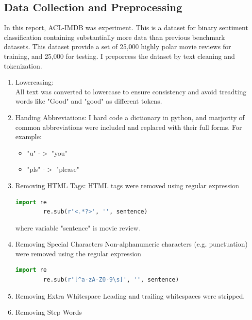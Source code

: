 \documentclass[12pt,a4paper]{article}
\begin{document}
\subsection{Data Collection and Preprocessing}
In this report, ACL-IMDB \parencite{maas-EtAl:2011:ACL-HLT2011} was experiment. This is a dataset for binary sentiment classification containing substantially more data than previous benchmark datasets. This dataset provide a set of 25,000 highly polar movie reviews for training, and 25,000 for testing. I preporcess the dataset by text cleaning and tokenization.
\begin{enumerate}
    \item Lowercasing:\\
    All text was converted to lowercase to ensure consistency and avoid treadting words like "Good" and "good" as different tokens.
    \item Handing Abbreviations:
    I hard code a dictionary in python, and marjority of common abbreviations were included and replaced with their full forms. For example:
    \begin{itemize}
        \item "u" -$>$ "you"
        \item "pls" -$>$ "please"
    \end{itemize}
    \item Removing HTML Tags:
    HTML tags were removed using regular expression 
    \begin{lstlisting}[language=Python] 
        import re
        re.sub(r'<.*?>', '', sentence) 
    \end{lstlisting}
    where variable "sentence" is movie review. 
    \item Removing Special Characters
    Non-alphanumeric characters (e.g. punctuation) were removed using the regular expression
    \begin{lstlisting}[language=Python]
        import re
        re.sub(r'[^a-zA-Z0-9\s]', '', sentence)
    \end{lstlisting}
    \item Removing Extra Whitespace
    Leading and trailing whitespaces were stripped. 
    \item Removing Step Words
    
\end{enumerate}
\end{document}
